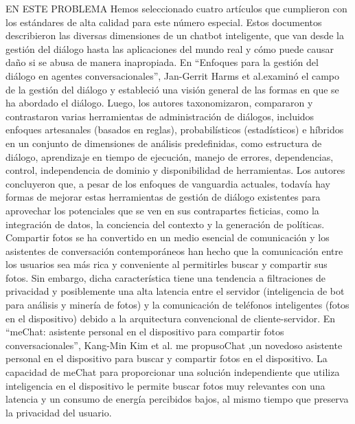 EN ESTE PROBLEMA
Hemos seleccionado cuatro artículos que cumplieron con los estándares de alta calidad para este número especial. Estos documentos describieron las diversas dimensiones de un chatbot inteligente, que van desde la gestión del diálogo hasta las aplicaciones del mundo real y cómo puede causar daño si se abusa de manera inapropiada.
En “Enfoques para la gestión del diálogo en agentes conversacionales”, Jan-Gerrit Harms et al.examinó el campo de la gestión del diálogo y estableció una visión general de las formas en que se ha abordado el diálogo. Luego, los autores taxonomizaron, compararon y contrastaron varias herramientas de administración de diálogos, incluidos enfoques artesanales (basados ​​en reglas), probabilísticos (estadísticos) e híbridos en un conjunto de dimensiones de análisis predefinidas, como estructura de diálogo, aprendizaje en tiempo de ejecución, manejo de errores, dependencias, control, independencia de dominio y disponibilidad de herramientas. Los autores concluyeron que, a pesar de los enfoques de vanguardia actuales, todavía hay formas de mejorar estas herramientas de gestión de diálogo existentes para aprovechar los potenciales que se ven en sus contrapartes ficticias, como la integración de datos, la conciencia del contexto y la generación de políticas.
Compartir fotos se ha convertido en un medio esencial de comunicación y los asistentes de conversación contemporáneos han hecho que la comunicación entre los usuarios sea más rica y conveniente al permitirles buscar y compartir sus fotos. Sin embargo, dicha característica tiene una tendencia a filtraciones de privacidad y posiblemente una alta latencia entre el servidor (inteligencia de bot para análisis y minería de fotos) y la comunicación de teléfonos inteligentes (fotos en el dispositivo) debido a la arquitectura convencional de cliente-servidor. En “meChat: asistente personal en el dispositivo para compartir fotos conversacionales”, Kang-Min Kim et al. me propusoChat ,un novedoso asistente personal en el dispositivo para buscar y compartir fotos en el dispositivo. La capacidad de meChat para proporcionar una solución independiente que utiliza inteligencia en el dispositivo le permite buscar fotos muy relevantes con una latencia y un consumo de energía percibidos bajos, al mismo tiempo que preserva la privacidad del usuario.
